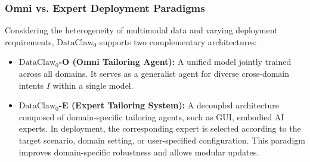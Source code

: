 \documentclass{llmxive}
\begin{document}
\subsubsection{Omni vs. Expert Deployment Paradigms}

Considering the heterogeneity of multimodal data and varying deployment requirements, $\text{DataClaw}_0$ supports two complementary architectures:
\begin{itemize}[leftmargin=20pt, labelsep=4pt]
    \item \textbf{$\text{DataClaw}_0$-O (Omni Tailoring Agent):} A unified model jointly trained across all domains. It serves as a generalist agent for diverse cross-domain intents \(I\) within a single model.
    
    \item \textbf{$\text{DataClaw}_0$-E (Expert Tailoring System):} A decoupled architecture composed of domain-specific tailoring agents, such as GUI, embodied AI experts. In deployment, the corresponding expert is selected according to the target scenario, domain setting, or user-specified configuration. This paradigm improves domain-specific robustness and allows modular updates.
\end{itemize}






\end{document}
